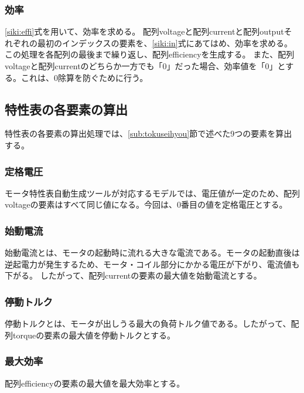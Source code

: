 \subsubsection{効率}\label{sub:sub:kouritu}
\ref{siki:effi}式を用いて、効率を求める。
配列voltageと配列currentと配列outputそれぞれの最初のインデックスの要素を、\ref{siki:in}式にあてはめ、効率を求める。
この処理を各配列の最後まで繰り返し、配列efficiencyを生成する。
また、配列voltageと配列currentのどちらか一方でも「0」だった場合、効率値を「0」とする。これは、0除算を防ぐために行う。
\subsection{特性表の各要素の算出}\label{sub:youso_mortoku}
特性表の各要素の算出処理では、\ref{sub:tokuseihyou}節で述べた9つの要素を算出する。



\subsubsection{定格電圧}\label{sub:sub:dennatu}
モータ特性表自動生成ツールが対応するモデルでは、電圧値が一定のため、配列voltageの要素はすべて同じ値になる。今回は、0番目の値を定格電圧とする。

\subsubsection{始動電流}\label{sub:sub:sidouden}
始動電流とは、モータの起動時に流れる大きな電流である。モータの起動直後は逆起電力が発生するため、モータ・コイル部分にかかる電圧が下がり、電流値も下がる。
したがって、配列currentの要素の最大値を始動電流とする。

\subsubsection{停動トルク}\label{sub:sub:teidoutoruku}
停動トルクとは、モータが出しうる最大の負荷トルク値である。したがって、配列torqueの要素の最大値を停動トルクとする。

\subsubsection{最大効率}\label{sub:sub:saidaikouritu}
配列efficiencyの要素の最大値を最大効率とする。

